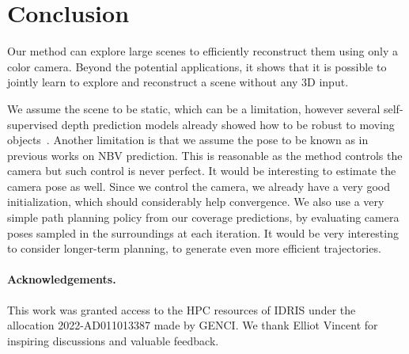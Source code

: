 \section{Conclusion}
\label{sec:conclusion}

Our method can explore large scenes to efficiently reconstruct them using only a color camera. Beyond the potential applications, it shows that it is possible to jointly learn to explore and reconstruct a scene without any 3D input. 

We assume the scene to be static, which can be a limitation, however several self-supervised depth prediction models already showed how to be robust to moving objects~\cite{watson-cvpr21-temporal-opportunist-manydepth}. Another limitation is that we assume the pose to be known as in previous works on NBV prediction. This is reasonable as the method controls the camera but such control is never perfect. It would be interesting to estimate the camera pose as well. Since we control the camera, we already have a very good initialization, which should considerably help convergence.
We also use a very simple path planning policy from our coverage predictions, by evaluating camera poses sampled in the surroundings at each iteration. It would be very interesting to consider longer-term planning, to generate even more efficient trajectories.

\paragraph{Acknowledgements.}
This work was granted access to the HPC resources of IDRIS under the allocation 2022-AD011013387 made by GENCI. We thank Elliot Vincent for inspiring discussions and valuable feedback.